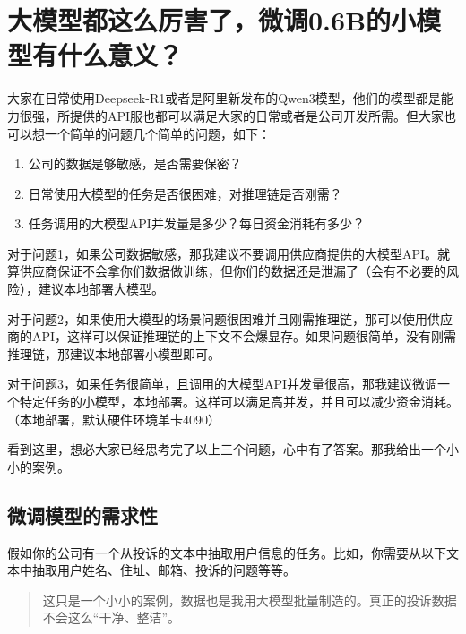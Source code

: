 \documentclass[
]{article}
\author{}
\date{}
\providecommand{\tightlist}{%
  \setlength{\itemsep}{0pt}\setlength{\parskip}{0pt}}
\begin{document}
{
\setcounter{tocdepth}{3}
\tableofcontents
}
\section{大模型都这么厉害了，微调0.6B的小模型有什么意义？}\label{ux5927ux6a21ux578bux90fdux8fd9ux4e48ux5389ux5bb3ux4e86ux5faeux8c030.6bux7684ux5c0fux6a21ux578bux6709ux4ec0ux4e48ux610fux4e49}

大家在日常使用Deepseek-R1或者是阿里新发布的Qwen3模型，他们的模型都是能力很强，所提供的API服也都可以满足大家的日常或者是公司开发所需。但大家也可以想一个简单的问题几个简单的问题，如下：

\begin{enumerate}
\def\labelenumi{\arabic{enumi}.}
\tightlist
\item
  公司的数据是够敏感，是否需要保密？
\item
  日常使用大模型的任务是否很困难，对推理链是否刚需？
\item
  任务调用的大模型API并发量是多少？每日资金消耗有多少？
\end{enumerate}

对于问题1，如果公司数据敏感，那我建议不要调用供应商提供的大模型API。就算供应商保证不会拿你们数据做训练，但你们的数据还是泄漏了（会有不必要的风险），建议本地部署大模型。

对于问题2，如果使用大模型的场景问题很困难并且刚需推理链，那可以使用供应商的API，这样可以保证推理链的上下文不会爆显存。如果问题很简单，没有刚需推理链，那建议本地部署小模型即可。

对于问题3，如果任务很简单，且调用的大模型API并发量很高，那我建议微调一个特定任务的小模型，本地部署。这样可以满足高并发，并且可以减少资金消耗。（本地部署，默认硬件环境单卡4090）

看到这里，想必大家已经思考完了以上三个问题，心中有了答案。那我给出一个小小的案例。

\subsection{微调模型的需求性}\label{ux5faeux8c03ux6a21ux578bux7684ux9700ux6c42ux6027}

假如你的公司有一个从投诉的文本中抽取用户信息的任务。比如，你需要从以下文本中抽取用户姓名、住址、邮箱、投诉的问题等等。

\begin{quote}
这只是一个小小的案例，数据也是我用大模型批量制造的。真正的投诉数据不会这么``干净、整洁''。
\end{quote}
\end{document}

